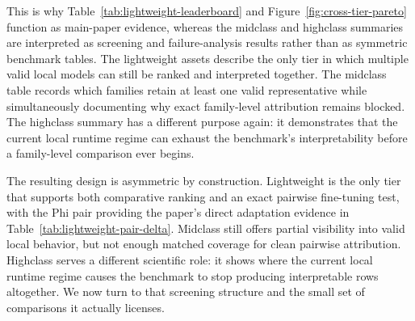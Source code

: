 This is why Table~\ref{tab:lightweight-leaderboard} and Figure~\ref{fig:cross-tier-pareto} function as main-paper evidence, whereas the midclass and highclass summaries are interpreted as screening and failure-analysis results rather than as symmetric benchmark tables. The lightweight assets describe the only tier in which multiple valid local models can still be ranked and interpreted together. The midclass table records which families retain at least one valid representative while simultaneously documenting why exact family-level attribution remains blocked. The highclass summary has a different purpose again: it demonstrates that the current local runtime regime can exhaust the benchmark's interpretability before a family-level comparison ever begins.

The resulting design is asymmetric by construction. Lightweight is the only tier that supports both comparative ranking and an exact pairwise fine-tuning test, with the Phi pair providing the paper's direct adaptation evidence in Table~\ref{tab:lightweight-pair-delta}. Midclass still offers partial visibility into valid local behavior, but not enough matched coverage for clean pairwise attribution. Highclass serves a different scientific role: it shows where the current local runtime regime causes the benchmark to stop producing interpretable rows altogether. We now turn to that screening structure and the small set of comparisons it actually licenses.
